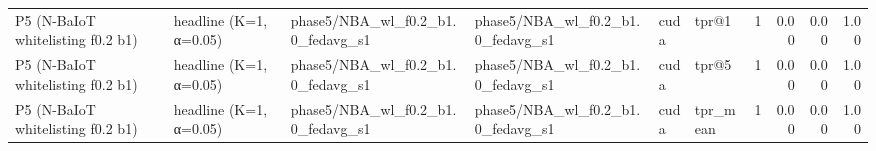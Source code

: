 \begin{tabular}{llllllrrrr}
P5 (N-BaIoT whitelisting f0.2 b1) & headline (K=1, α=0.05) & phase5/NBA\_wl\_f0.2\_b1.0\_fedavg\_s1 & phase5/NBA\_wl\_f0.2\_b1.0\_fedavg\_s1 & cuda & tpr@1 & 1 & 0.00 & 0.00 & 1.00 \\
P5 (N-BaIoT whitelisting f0.2 b1) & headline (K=1, α=0.05) & phase5/NBA\_wl\_f0.2\_b1.0\_fedavg\_s1 & phase5/NBA\_wl\_f0.2\_b1.0\_fedavg\_s1 & cuda & tpr@5 & 1 & 0.00 & 0.00 & 1.00 \\
P5 (N-BaIoT whitelisting f0.2 b1) & headline (K=1, α=0.05) & phase5/NBA\_wl\_f0.2\_b1.0\_fedavg\_s1 & phase5/NBA\_wl\_f0.2\_b1.0\_fedavg\_s1 & cuda & tpr\_mean & 1 & 0.00 & 0.00 & 1.00 \\
\bottomrule
\end{tabular}

